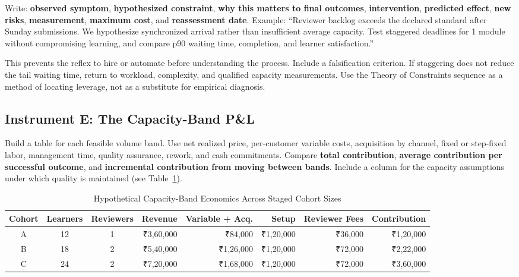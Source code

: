 Write: \textbf{observed symptom}, \textbf{hypothesized constraint}, \textbf{why this matters to final outcomes}, \textbf{intervention}, \textbf{predicted effect}, \textbf{new risks}, \textbf{measurement}, \textbf{maximum cost}, and \textbf{reassessment date}. Example: ``Reviewer backlog exceeds the declared standard after Sunday submissions. We hypothesize synchronized arrival rather than insufficient average capacity. Test staggered deadlines for 1 module without compromising learning, and compare p90 waiting time, completion, and learner satisfaction.''

This prevents the reflex to hire or automate before understanding the process. Include a falsification criterion. If staggering does not reduce the tail waiting time, return to workload, complexity, and qualified capacity measurements. Use the Theory of Constraints sequence as a method of locating leverage, not as a substitute for empirical diagnosis.

\subsection{Instrument E: The Capacity-Band P\&L}
\label{sec:instrument_e_capacity_band_pnl}

Build a table for each feasible volume band. Use net realized price, per-customer variable costs, acquisition by channel, fixed or step-fixed labor, management time, quality assurance, rework, and cash commitments. Compare \textbf{total contribution}, \textbf{average contribution per successful outcome}, and \textbf{incremental contribution from moving between bands}. Include a column for the capacity assumptions under which quality is maintained (see Table~\ref{tab:capacity_band_pnl}).

\begin{table}[t]
\centering
\small
\caption{Hypothetical Capacity-Band Economics Across Staged Cohort Sizes}
\label{tab:capacity_band_pnl}
\begin{tabularx}{\textwidth}{c c c r r r r r}
\toprule
\textbf{Cohort} & \textbf{Learners} & \textbf{Reviewers} & \textbf{Revenue} & \textbf{Variable + Acq.} & \textbf{Setup} & \textbf{Reviewer Fees} & \textbf{Contribution} \\
\midrule
A & 12 & 1 & ₹3,60,000 & ₹84,000  & ₹1,20,000 & ₹36,000 & ₹1,20,000 \\
B & 18 & 2 & ₹5,40,000 & ₹1,26,000 & ₹1,20,000 & ₹72,000 & ₹2,22,000 \\
C & 24 & 2 & ₹7,20,000 & ₹1,68,000 & ₹1,20,000 & ₹72,000 & ₹3,60,000 \\
\bottomrule
\end{tabularx}
\end{table}

